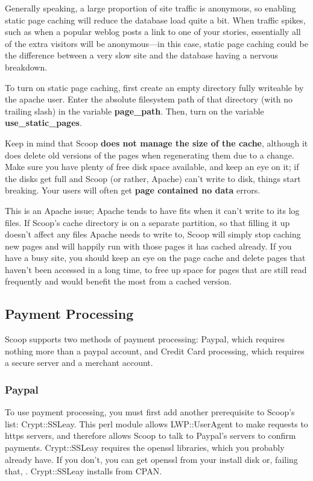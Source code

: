 Generally speaking, a large proportion of site traffic is anonymous, so enabling static page caching will reduce the database load quite a bit.  When traffic spikes, such as when a popular weblog posts a link to one of your stories, essentially all of the extra visitors will be anonymous---in this case, static page caching could be the difference between a very slow site and the database having a nervous breakdown.

To turn on static page caching, first create an empty directory fully writeable by the apache user.  Enter the absolute filesystem path of that directory (with no trailing slash) in the variable {\bf page\_path}.  Then, turn on the variable {\bf use\_static\_pages}.

Keep in mind that Scoop {\bf does not manage the size of the cache}, although it does delete old versions of the pages when regenerating them due to a change.  Make sure you have plenty of free disk space available, and keep an eye on it; if the disks get full and Scoop (or rather, Apache) can't write to disk, things start breaking.  Your users will often get {\bf page contained no data} errors.  

This is an Apache issue; Apache tends to have fits when it can't write to its log files. If Scoop's cache directory is on a separate partition, so that filling it up doesn't affect any files Apache needs to write to, Scoop will simply stop caching new pages and will happily run with those pages it has cached already. If you have a busy site, you should keep an eye on the page cache and delete pages that haven't been accessed in a long time, to free up space for pages that are still read frequently and would benefit the most from a cached version.

\subsection{Payment Processing}
\label{features-cc-paypal}

Scoop supports two methods of payment processing: Paypal, which requires nothing more than a paypal account, and Credit Card processing, which requires a secure server and a merchant account.

\subsubsection{Paypal}

To use payment processing, you must first add another prerequisite to Scoop's list: Crypt::SSLeay. This perl module allows LWP::UserAgent to make requests to https servers, and therefore allows Scoop to talk to Paypal's servers to confirm payments. Crypt::SSLeay requires the openssl libraries, which you probably already have. If you don't, you can get openssl from your install disk or, failing that, . Crypt::SSLeay installs from CPAN.

